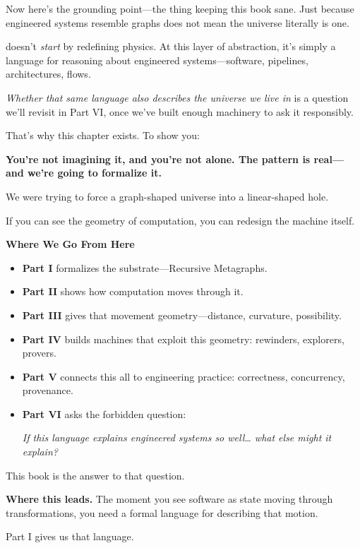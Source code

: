 Now here’s the grounding point—the thing keeping this book sane.  
Just because engineered systems resemble graphs does not mean the universe literally is one.

\COMPUTER{} doesn’t \textit{start} by redefining physics.  
At this layer of abstraction, it's simply a language for reasoning about engineered systems—software, pipelines, architectures, flows.  

\textit{Whether that same language also describes the universe we live in}  
is a question we’ll revisit in Part VI, once we've built enough machinery to ask it responsibly.

That’s why this chapter exists.  
To show you:

\begin{center}
\textbf{You're not imagining it, and you're not alone.  
The pattern is real—and we're going to formalize it.}
\end{center}

We were trying to force a graph-shaped universe into a linear-shaped hole.

If you can see the geometry of computation, you can redesign the machine itself.

\medskip

\noindent\textbf{Where We Go From Here}

\begin{itemize}
    \item \textbf{Part I} formalizes the substrate—Recursive Metagraphs.
    \item \textbf{Part II} shows how computation moves through it.
    \item \textbf{Part III} gives that movement geometry—distance, curvature, possibility.
    \item \textbf{Part IV} builds machines that exploit this geometry: rewinders, explorers, provers.
    \item \textbf{Part V} connects this all to engineering practice: correctness, concurrency, provenance.
    \item \textbf{Part VI} asks the forbidden question:
    
    \begin{center}
    \textit{If this language explains engineered systems so well…  
    what else might it explain?}
    \end{center}
\end{itemize}

This book is the answer to that question.

\bigskip

\noindent\textbf{Where this leads.}  
The moment you see software as state moving through transformations,  
you need a formal language for describing that motion.

Part I gives us that language.

